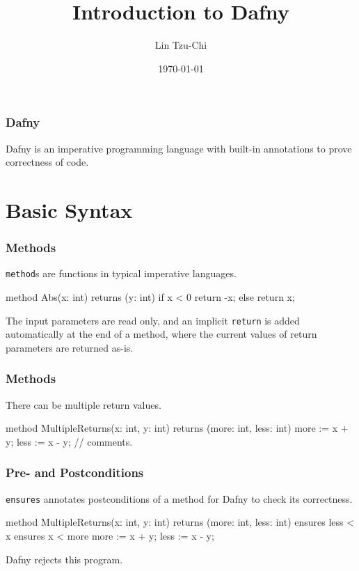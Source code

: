 \documentclass[10pt, compress]{beamer}
\title{Introduction to Dafny}
\subtitle{}
\date{\today}
\author{Lin Tzu-Chi}
\begin{document}
\maketitle

\begin{frame}[fragile]
  \frametitle{Dafny}

  Dafny is an imperative programming language with built-in annotations to prove correctness of code.
  
\end{frame}

\section{Basic Syntax}

\begin{frame}[fragile]
  \frametitle{Methods}
  
  \verb|method|s are functions in typical imperative languages.
  
  \begin{verbnobox}[\footnotesize]
method Abs(x: int) returns (y: int)
{
   if x < 0
     { return -x; }
   else
     { return x; }
}
  \end{verbnobox}
  The input parameters are read only, and an implicit \verb|return| is added automatically at the end of a method, where the current values of return parameters are returned as-is.
\end{frame}

\begin{frame}[fragile]
  \frametitle{Methods}
  
  There can be multiple return values.
  \begin{verbnobox}[\footnotesize]
method MultipleReturns(x: int, y: int)
returns (more: int, less: int)
{
   more := x + y;
   less := x - y;
   // comments.
}
  \end{verbnobox}
\end{frame}

\begin{frame}[fragile]
  \frametitle{Pre- and Postconditions}
  \verb|ensures| annotates postconditions of a method for Dafny to check its correctness. 
  \begin{verbnobox}[\footnotesize]
method MultipleReturns(x: int, y: int)
returns (more: int, less: int)
   ensures less < x
   ensures x < more
{
   more := x + y;
   less := x - y;
}
  \end{verbnobox}	
  
Dafny rejects this program.
\end{frame}
\end{document}
